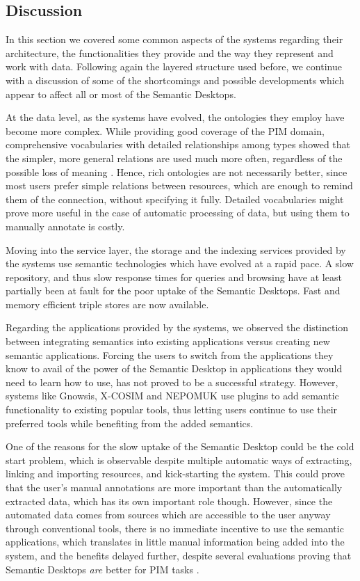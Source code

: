 \subsection{Discussion}

In this section we covered some common aspects of the systems regarding their architecture, the functionalities they provide and the way they represent and work with data.
Following again the layered structure used before, we continue with a discussion of some of the shortcomings and possible developments which appear to affect all or most of the Semantic Desktops. 

At the data level, as the systems have evolved, the ontologies they employ have become more complex. While providing good coverage of the PIM domain, comprehensive vocabularies with detailed relationships among types showed that the simpler, more general relations are used much more often, regardless of the possible loss of meaning \cite{Sauermann2008}. Hence, rich ontologies are not necessarily better, since most users prefer simple relations between resources, which are enough to remind them of the connection, without specifying it fully. Detailed vocabularies might prove more useful in the case of automatic processing of data, but using them to manually annotate is costly.

Moving into the service layer, the storage and the indexing services provided by the systems use semantic technologies which have evolved at a rapid pace. A slow repository, and thus slow response times for queries and browsing have at least partially been at fault for the poor uptake of the Semantic Desktops. Fast and memory efficient triple stores are now available.

Regarding the applications provided by the systems, we observed the distinction between integrating semantics into existing applications versus creating new semantic applications. 
Forcing the users to switch from the applications they know to avail of the power of the Semantic Desktop in applications they would need to learn how to use, has not proved to be a successful strategy. However, systems like Gnowsis, X-COSIM and NEPOMUK use plugins to add semantic functionality to existing popular tools, thus letting users continue to use their preferred tools while benefiting from the added semantics.

One of the reasons for the slow uptake of the Semantic Desktop could be the cold start problem, which is observable despite multiple automatic ways of extracting, linking and importing resources, and kick-starting the system. This could prove that the user's manual annotations are more important than the automatically extracted data, which has its own important role though. However, since the automated data comes from sources which are accessible to the user anyway through conventional tools, there is no immediate incentive to use the semantic applications, which translates in little manual information being added into the system, and the benefits delayed further, despite several evaluations \cite{Franz2007,Sauermann2008} proving that Semantic Desktops \emph{are} better for PIM tasks \cite{Franz2009}.

